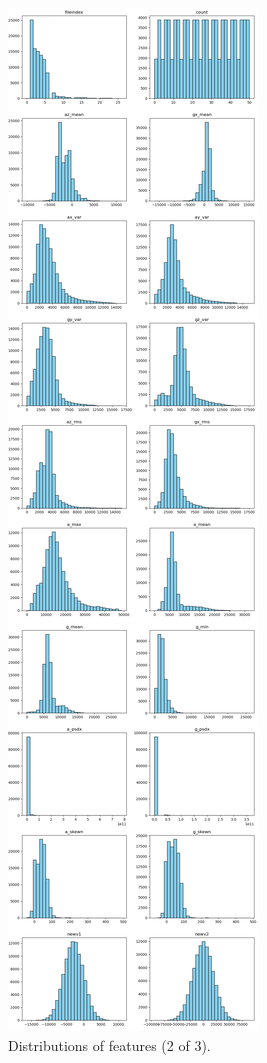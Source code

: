 \documentclass[10pt,twocolumn]{article}
\begin{document}
\begin{figure}[H]
    \centering
    \includegraphics[width=0.85\linewidth, height=0.9\textheight]{images/distribution_2.png}
    \caption{Distributions of features (2 of 3).}
    \label{fig:distribution-2}
\end{figure}
\end{document}
